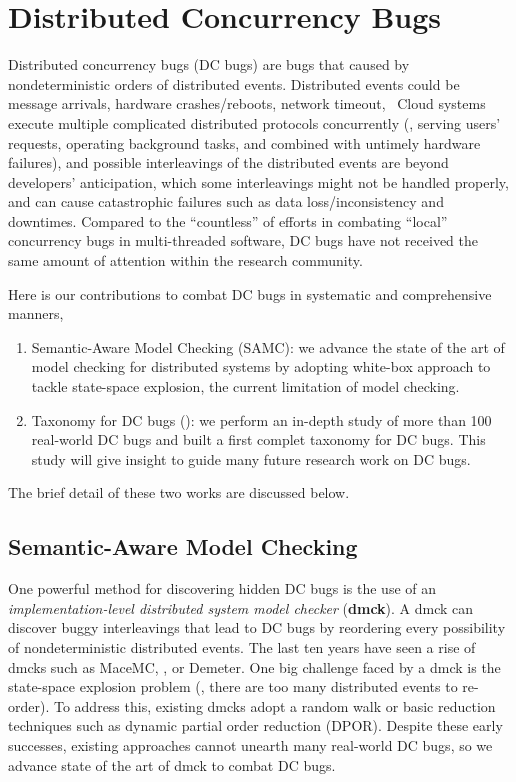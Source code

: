 \section{Distributed Concurrency Bugs}

Distributed concurrency bugs (DC bugs) are bugs that caused by nondeterministic
orders of distributed events. Distributed events could be message arrivals,
hardware crashes/reboots, network timeout, \etc\ Cloud systems execute multiple
complicated distributed protocols concurrently (\eg, serving users' requests,
operating background tasks, and combined with untimely hardware failures), and
possible interleavings of the distributed events are beyond developers'
anticipation, which some interleavings might not be handled properly, and can
cause catastrophic failures such as data loss/inconsistency and downtimes.
Compared to the ``countless'' of efforts in combating ``local'' concurrency bugs
in multi-threaded software, DC bugs have not received the same amount of
attention within the research community.

Here is our contributions to combat DC bugs in systematic and comprehensive manners,

\begin{enumerate}

\item Semantic-Aware Model Checking (SAMC): we advance the state of the art of
model checking for distributed systems by adopting white-box approach to tackle
state-space explosion, the current limitation of model checking.

\item Taxonomy for DC bugs (\taxdc): we perform an in-depth study of more than
100 real-world DC bugs and built a first complet taxonomy for DC bugs. This
study will give insight to guide many future research work on DC bugs.

\end{enumerate}

The brief detail of these two works are discussed below.

\subsection{Semantic-Aware Model Checking}

One powerful method for discovering hidden DC bugs is the use of an
\textit{implementation-level distributed system model checker} (\textbf{dmck}).
A dmck can discover buggy interleavings that lead to DC bugs by reordering every
possibility of nondeterministic distributed events. The last ten years have seen
a rise of dmcks such as MaceMC, \modist, or Demeter. One big challenge faced by a
dmck is the state-space explosion problem (\ie, there are too many distributed
events to re-order). To address this, existing dmcks adopt a random walk or
basic reduction techniques such as dynamic partial order reduction (DPOR).
Despite these early successes, existing approaches cannot unearth many
real-world DC bugs, so we advance state of the art of dmck to combat DC bugs.

